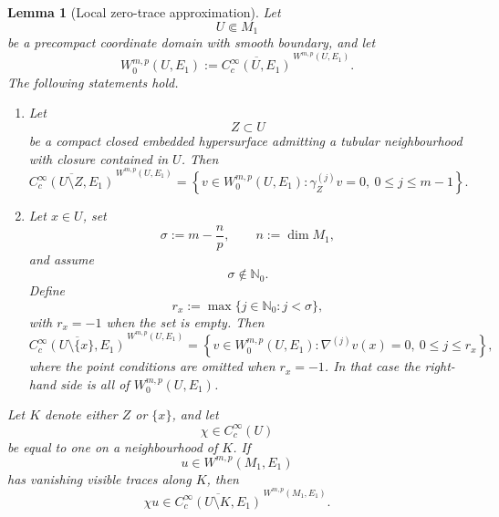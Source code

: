 \documentclass[11pt]{article}
\theoremstyle{plain}
\newtheorem{lemma}[theorem]{Lemma}
\theoremstyle{definition}
\begin{document}
\begin{lemma}[Local zero-trace approximation]
\label{lem:local-zero-trace-approximation}
Let
\[
  U\Subset M_1
\]
be a precompact coordinate domain with smooth boundary, and let
\[
  W_0^{m,p}(U,E_1)
  :=
  \overline{
    C_c^\infty(U,E_1)
  }^{\,W^{m,p}(U,E_1)}.
\]
The following statements hold.

\begin{enumerate}[label=\textup{(\roman*)}]
  \item Let
        \[
          Z\subset U
        \]
        be a compact closed embedded hypersurface admitting a tubular
        neighbourhood with closure contained in \(U\). Then
        \[
          \boxed{
          \overline{
            C_c^\infty(U\setminus Z,E_1)
          }^{\,W^{m,p}(U,E_1)}
          =
          \left\{
            v\in W_0^{m,p}(U,E_1):
            \gamma_Z^{(j)}v=0,
            \ 0\leq j\leq m-1
          \right\}.
          }
        \]

  \item Let \(x\in U\), set
        \[
          \sigma:=m-\frac{n}{p},
          \qquad
          n:=\dim M_1,
        \]
        and assume
        \[
          \sigma\notin\mathbb N_0.
        \]
        Define
        \[
          r_x
          :=
          \max\{j\in\mathbb N_0:j<\sigma\},
        \]
        with \(r_x=-1\) when the set is empty. Then
        \[
          \boxed{
          \overline{
            C_c^\infty(U\setminus\{x\},E_1)
          }^{\,W^{m,p}(U,E_1)}
          =
          \left\{
            v\in W_0^{m,p}(U,E_1):
            \nabla^{(j)}v(x)=0,
            \ 0\leq j\leq r_x
          \right\},
          }
        \]
        where the point conditions are omitted when \(r_x=-1\). In
        that case the right-hand side is all of
        \(W_0^{m,p}(U,E_1)\).
\end{enumerate}

Let \(K\) denote either \(Z\) or \(\{x\}\), and let
\[
  \chi\in C_c^\infty(U)
\]
be equal to one on a neighbourhood of \(K\). If
\[
  u\in W^{m,p}(M_1,E_1)
\]
has vanishing visible traces along \(K\), then
\[
  \chi u
  \in
  \overline{
    C_c^\infty(U\setminus K,E_1)
  }^{\,W^{m,p}(M_1,E_1)}.
\]
\end{lemma}
\end{document}
